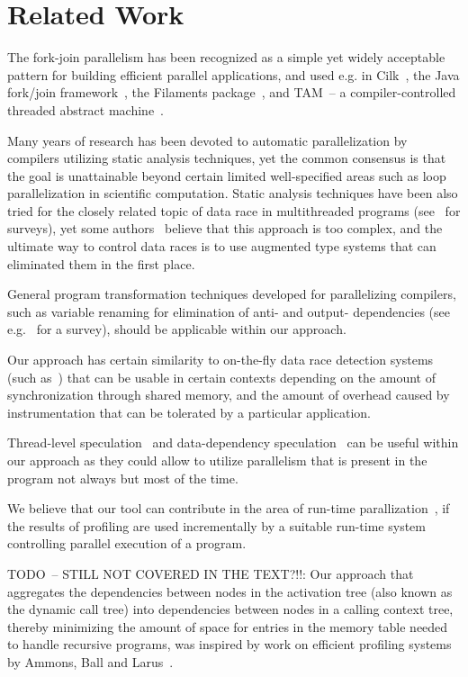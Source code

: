 %

\section{Related Work}

The fork-join parallelism has been recognized as a simple yet widely
acceptable pattern for building efficient parallel applications, and used e.g. in
Cilk~\cite{BJKLR96}, the Java fork/join framework~\cite{Lea00}, the
Filaments package~\cite{LF00}, and {TAM}~-- a compiler-controlled
threaded abstract machine~\cite{CGSE93,GSC95}. 

Many years of research has been devoted to automatic parallelization
by compilers utilizing static analysis techniques, yet the common
consensus is that the goal is unattainable beyond certain limited
well-specified areas such as loop parallelization in scientific
computation. Static analysis techniques have been also tried for the
closely related topic of data race in multithreaded programs
(see~\cite{Rinard01,NAW06} for surveys), yet some
authors~\cite{Rinard01} believe that this approach is too complex, and
the ultimate way to control data races is to use augmented type systems
that can eliminated them in the first place.

General program transformation techniques developed for parallelizing
compilers, such as variable renaming for elimination of anti- and
output- dependencies (see e.g.~\cite{Bacon:1994:CompilerTransformation}
for a survey), should be applicable within our approach.

Our approach has certain similarity to on-the-fly data race detection
systems (such as~\cite{MellorCrummey91,SBNSA97,HRY02}) that can be
usable in certain contexts depending on the amount of synchronization
through shared memory, and the amount of overhead caused by instrumentation that
can be tolerated by a particular application.

Thread-level speculation~\cite{PO03} and data-dependency
speculation~\cite{RS01b} can be useful within our approach as they could
allow to utilize parallelism that is present in the program not always
but most of the time.

We believe that our tool can contribute in the area of run-time
parallization~\cite{Rauchwerger98}, if the results of profiling are used
incrementally by a suitable run-time system controlling parallel
execution of a program.

TODO~-- STILL NOT COVERED IN THE TEXT?!!: Our approach that aggregates
the dependencies between nodes in the activation tree (also known as the
dynamic call tree) into dependencies between nodes in a calling context
tree, thereby minimizing the amount of space for entries in the memory
table needed to handle recursive programs, was inspired by work on
efficient profiling systems by Ammons, Ball and Larus~\cite{ABL97}.

